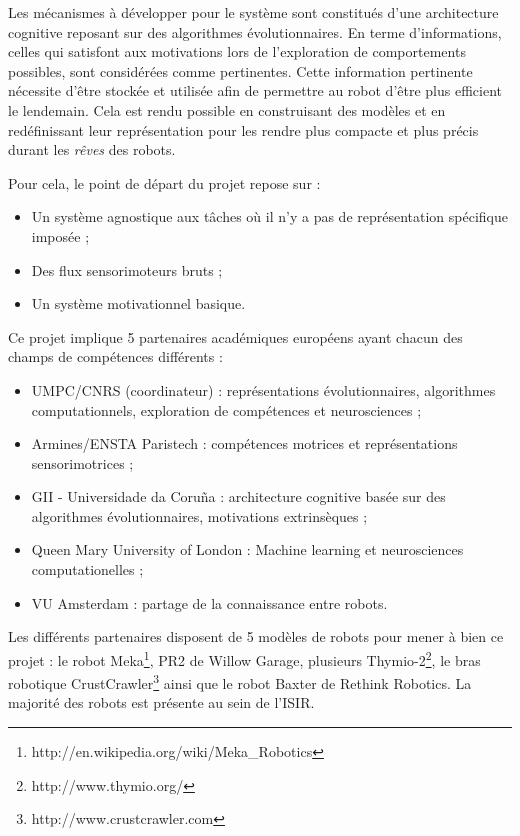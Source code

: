 \documentclass[draft]{llncs}
\begin{document}
Les mécanismes à développer pour le système sont constitués d'une architecture cognitive reposant sur des algorithmes évolutionnaires. 
En terme d'informations, celles qui satisfont aux motivations lors de l'exploration de comportements possibles, sont considérées comme pertinentes.
Cette information pertinente nécessite d'être stockée et utilisée afin de permettre au robot d'être plus efficient le lendemain.
Cela est rendu possible en construisant des modèles et en redéfinissant leur représentation pour les rendre plus compacte et plus précis durant les \textit{rêves} des robots.

Pour cela, le point de départ du projet repose sur : 

\begin{itemize}
  \item Un système agnostique aux tâches où il n'y a pas de représentation spécifique imposée ;
  \item Des flux sensorimoteurs bruts ;
  \item Un système motivationnel basique.
\end{itemize}

Ce projet implique 5 partenaires académiques européens ayant chacun des champs de compétences différents : 

\begin{itemize}
  \item UMPC/CNRS (coordinateur) : représentations évolutionnaires, algorithmes computationnels, exploration de compétences et neurosciences ;
  \item Armines/ENSTA Paristech : compétences motrices et représentations sensorimotrices ;
  \item GII - Universidade da Coruña :  architecture cognitive basée sur des algorithmes évolutionnaires, motivations extrinsèques ;
  \item Queen Mary University of London : Machine learning et neurosciences computationelles ;
  \item VU Amsterdam : partage de la connaissance entre robots.
\end{itemize}

Les différents partenaires disposent de 5 modèles de robots pour mener à bien ce projet : le robot Meka\footnote{http://en.wikipedia.org/wiki/Meka\_Robotics}, PR2 de Willow Garage, plusieurs Thymio-2\footnote{http://www.thymio.org/}, le bras robotique CrustCrawler\footnote{http://www.crustcrawler.com} ainsi que le robot Baxter de Rethink Robotics. La majorité des robots est présente au sein de l'ISIR.
\end{document}
